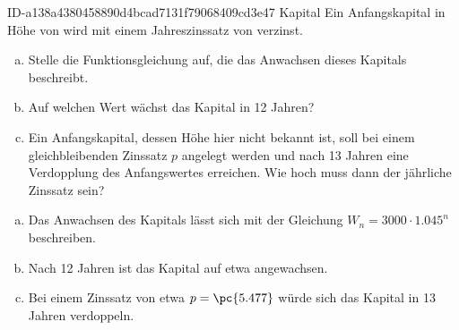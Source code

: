 \begin{exercise}
      {ID-a138a4380458890d4bcad7131f79068409cd3e47}
      {Kapital}
  \ifproblem\problem
    Ein Anfangskapital in Höhe von  wird mit einem Jahreszinssatz
    von  verzinst.
    \begin{enumerate}[a)]
      \item Stelle die Funktionsgleichung auf, die das Anwachsen dieses
            Kapitals beschreibt.
      \item Auf welchen Wert wächst das Kapital in 12 Jahren?
      \item Ein Anfangskapital, dessen Höhe hier nicht bekannt ist, soll
            bei einem gleichbleibenden Zinssatz $p$ angelegt werden und nach
            13 Jahren eine Verdopplung des Anfangswertes erreichen.
            Wie hoch muss dann der jährliche Zinssatz sein?
    \end{enumerate}
  \fi
  \ifoutcome\outcome
    \begin{enumerate}[a)]
      \item Das Anwachsen des Kapitals lässt sich mit der Gleichung
            $W_{n}=\num{3000}\cdot\num{1.045}^{n}$ beschreiben.
      \item Nach 12 Jahren ist das Kapital auf etwa 
            angewachsen.
      \item Bei einem Zinssatz von etwa $p=\pc{5.477}$ würde sich das
            Kapital in 13 Jahren verdoppeln.
    \end{enumerate}
  \fi
\end{exercise}
